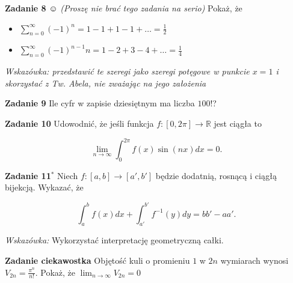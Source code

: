 \documentclass[a4paper,11pt]{article}
\begin{document}
\bigskip

\textbf{Zadanie 8} {\DejaSans ☺} \textit{(Proszę nie brać tego zadania na
serio)} Pokaż, że 

\begin{itemize}
    \item $\sum_{n=0}^\infty (-1)^n = 1 -1 + 1 - 1 + \ldots = \frac{1}{2}$
    \item $\sum_{n=0}^\infty (-1)^{n-1} n = 1 -2 + 3 - 4 + \ldots =
        \frac{1}{4}$
\end{itemize}

\textit{Wskazówka: przedstawić te szeregi jako szeregi potęgowe w punkcie
$x=1$ i skorzystać z Tw. Abela, nie zważając na jego założenia}

\bigskip

\textbf{Zadanie 9} Ile cyfr w zapisie dziesiętnym ma liczba $100!$?

\bigskip

\textbf{Zadanie 10} Udowodnić, że jeśli funkcja $f:[0,2\pi] \to
\mathbb{R}$ jest ciągła to 

$$\lim_{n\to \infty} \int_{0}^{2\pi} f(x) \sin(nx) dx = 0.$$

\bigskip

\textbf{Zadanie 11$^\ast$} Niech $f: [a,b] \to  [a',b']$ będzie dodatnią,
rosnącą i ciągłą bijekcją. Wykazać, że 

$$\int_{a}^b f(x) dx + \int_{a'}^{b'} f^{-1}(y) dy = bb' - aa'.$$

\textit{Wskazówka:} Wykorzystać interpretację geometryczną całki.


\hrulefill

\bigskip

\textbf{Zadanie ciekawostka} Objętość kuli o promieniu $1$ w $2n$
wymiarach wynosi $V_{2n} = \frac{\pi^{n}}{n!}$. Pokaż, że $\lim_{n\to
\infty} V_{2n} = 0$
\end{document}
